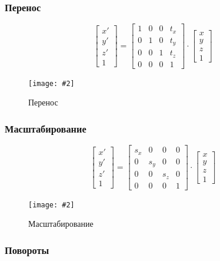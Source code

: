 \documentclass[a4paper, 14pt]{extarticle}
\newcommand{\screenshot}[3]{
	\begin{figure}[h]
		\centering
		\texttt{[image: \#2]}
		\caption{#3}
	\end{figure}
}
\begin{document}
\subsubsection{Перенос}
$$
\begin{bmatrix} x' \\ y' \\ z' \\ 1 \end{bmatrix} = 
\begin{bmatrix}
	1 & 0 & 0 & t_x \\
	0 & 1 & 0 & t_y \\
	0 & 0 & 1 & t_z \\
	0 & 0 & 0 & 1
\end{bmatrix}
\cdot
\begin{bmatrix} x \\ y \\ z \\ 1 \end{bmatrix}
$$
\screenshot{width=12cm}{l4/S005.jpg}{Перенос}

\subsubsection{Масштабирование}
$$
\begin{bmatrix} x' \\ y' \\ z' \\ 1 \end{bmatrix} = 
\begin{bmatrix}
s_x & 0 & 0 & 0 \\
0 & s_y & 0 & 0 \\
0 & 0 & s_z & 0 \\
0 & 0 & 0 & 1
\end{bmatrix}
\cdot
\begin{bmatrix} x \\ y \\ z \\ 1 \end{bmatrix}
$$
\screenshot{width=12cm}{l4/S006.jpg}{Масштабирование}

\subsubsection{Повороты}
\end{document}
